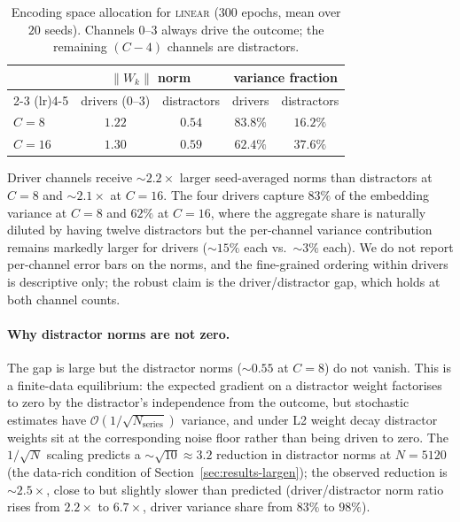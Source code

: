 \documentclass[11pt]{article}
\begin{document}
\begin{table}[h]
\centering
\caption{Encoding space allocation for \textsc{linear} ($300$
epochs, mean over $20$ seeds). Channels $0$--$3$ always drive the
outcome; the remaining $(C{-}4)$ channels are distractors.}
\label{tab:space}
\begin{tabular}{lcccc}
\toprule
& \multicolumn{2}{c}{$\|W_k\|$ norm} & \multicolumn{2}{c}{variance fraction} \\
\cmidrule(lr){2-3} \cmidrule(lr){4-5}
& drivers (0--3) & distractors & drivers & distractors \\
\midrule
$C{=}8$  & $1.22$ & $0.54$ & $83.8\%$ & $16.2\%$ \\
$C{=}16$ & $1.30$ & $0.59$ & $62.4\%$ & $37.6\%$ \\
\bottomrule
\end{tabular}
\end{table}

Driver channels receive ${\sim}2.2{\times}$ larger seed-averaged norms
than distractors at $C{=}8$ and ${\sim}2.1{\times}$ at $C{=}16$. The
four drivers capture $83\%$ of the embedding variance at $C{=}8$ and
$62\%$ at $C{=}16$, where the aggregate share is naturally diluted by
having twelve distractors but the per-channel variance contribution
remains markedly larger for drivers ($\sim$$15\%$ each vs.\
$\sim$$3\%$ each). We do not report per-channel error bars on the
norms, and the fine-grained ordering within drivers is descriptive
only; the robust claim is the driver/distractor gap, which holds at
both channel counts.

\paragraph{Why distractor norms are not zero.}
The gap is large but the distractor norms (${\sim}0.55$ at
$C{=}8$) do not vanish. This is a finite-data equilibrium: the
expected gradient on a distractor weight factorises to zero by
the distractor's independence from the outcome, but stochastic
estimates have $\mathcal{O}(1/\sqrt{N_{\text{series}}})$ variance,
and under L2 weight decay distractor weights sit at the
corresponding noise floor rather than being driven to zero. The
$1/\sqrt{N}$ scaling predicts a ${\sim}\sqrt{10} \approx 3.2$
reduction in distractor norms at $N{=}5120$ (the data-rich
condition of Section~\ref{sec:results-largen}); the observed
reduction is ${\sim}2.5\times$, close to but slightly slower than
predicted (driver/distractor norm ratio rises from $2.2\times$
to $6.7\times$, driver variance share from $83\%$ to $98\%$).
\end{document}
